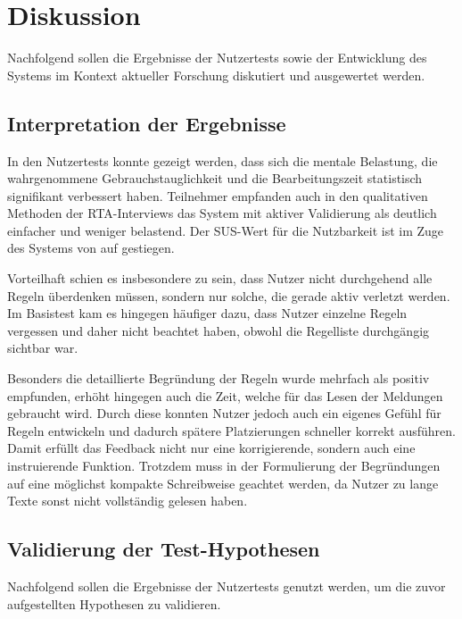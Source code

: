 \section{Diskussion}\label{section:Diskussion}

Nachfolgend sollen die Ergebnisse der Nutzertests sowie der Entwicklung des Systems im Kontext aktueller Forschung diskutiert und ausgewertet werden.

\subsection{Interpretation der Ergebnisse}

In den Nutzertests konnte gezeigt werden, dass sich die mentale Belastung, die wahrgenommene Gebrauchstauglichkeit und die Bearbeitungszeit statistisch signifikant verbessert haben. Teilnehmer empfanden auch in den qualitativen Methoden der RTA-Interviews das System mit aktiver Validierung als deutlich einfacher und weniger belastend. Der SUS-Wert für die Nutzbarkeit ist im Zuge des Systems von  auf  gestiegen.

Vorteilhaft schien es insbesondere zu sein, dass Nutzer nicht durchgehend alle Regeln überdenken müssen, sondern nur solche, die gerade aktiv verletzt werden. Im Basistest kam es hingegen häufiger dazu, dass Nutzer einzelne Regeln vergessen und daher nicht beachtet haben, obwohl die Regelliste durchgängig sichtbar war.

Besonders die detaillierte Begründung der Regeln wurde mehrfach als positiv empfunden, erhöht hingegen auch die Zeit, welche für das Lesen der Meldungen gebraucht wird. Durch diese konnten Nutzer jedoch auch ein eigenes Gefühl für Regeln entwickeln und dadurch spätere Platzierungen schneller korrekt ausführen. Damit erfüllt das Feedback nicht nur eine korrigierende, sondern auch eine instruierende Funktion. Trotzdem muss in der Formulierung der Begründungen auf eine möglichst kompakte Schreibweise geachtet werden, da Nutzer zu lange Texte sonst nicht vollständig gelesen haben.

\subsection{Validierung der Test-Hypothesen}

Nachfolgend sollen die Ergebnisse der Nutzertests genutzt werden, um die zuvor aufgestellten Hypothesen zu validieren.

